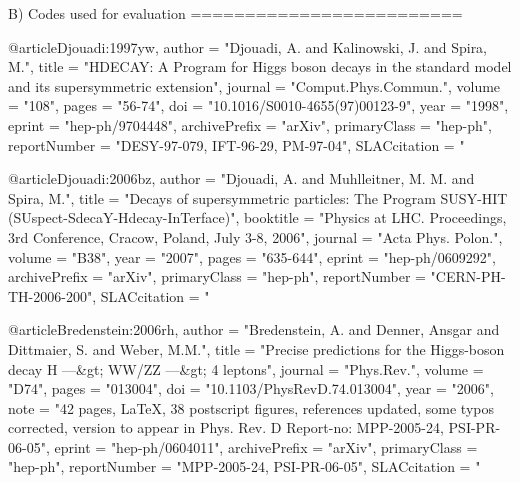 



B) Codes used for evaluation
   =========================

@article{Djouadi:1997yw,
      author         = "Djouadi, A. and Kalinowski, J. and Spira, M.",
      title          = "{HDECAY: A Program for Higgs boson decays in the standard
                        model and its supersymmetric extension}",
      journal        = "Comput.Phys.Commun.",
      volume         = "108",
      pages          = "56-74",
      doi            = "10.1016/S0010-4655(97)00123-9",
      year           = "1998",
      eprint         = "hep-ph/9704448",
      archivePrefix  = "arXiv",
      primaryClass   = "hep-ph",
      reportNumber   = "DESY-97-079, IFT-96-29, PM-97-04",
      SLACcitation   = "%
}

@article{Djouadi:2006bz,
      author         = "Djouadi, A. and Muhlleitner, M. M. and Spira, M.",
      title          = "{Decays of supersymmetric particles: The Program SUSY-HIT
                        (SUspect-SdecaY-Hdecay-InTerface)}",
      booktitle      = "{Physics at LHC. Proceedings, 3rd Conference, Cracow,
                        Poland, July 3-8, 2006}",
      journal        = "Acta Phys. Polon.",
      volume         = "B38",
      year           = "2007",
      pages          = "635-644",
      eprint         = "hep-ph/0609292",
      archivePrefix  = "arXiv",
      primaryClass   = "hep-ph",
      reportNumber   = "CERN-PH-TH-2006-200",
      SLACcitation   = "%
}

@article{Bredenstein:2006rh,
      author         = "Bredenstein, A. and Denner, Ansgar and Dittmaier, S. and
                        Weber, M.M.",
      title          = "{Precise predictions for the Higgs-boson decay H ---&gt;
                        WW/ZZ ---&gt; 4 leptons}",
      journal        = "Phys.Rev.",
      volume         = "D74",
      pages          = "013004",
      doi            = "10.1103/PhysRevD.74.013004",
      year           = "2006",
      note           = "42 pages, LaTeX, 38 postscript figures, references
                        updated, some typos corrected, version to appear in Phys.
                        Rev. D Report-no: MPP-2005-24, PSI-PR-06-05",
      eprint         = "hep-ph/0604011",
      archivePrefix  = "arXiv",
      primaryClass   = "hep-ph",
      reportNumber   = "MPP-2005-24, PSI-PR-06-05",
      SLACcitation   = "%
}

